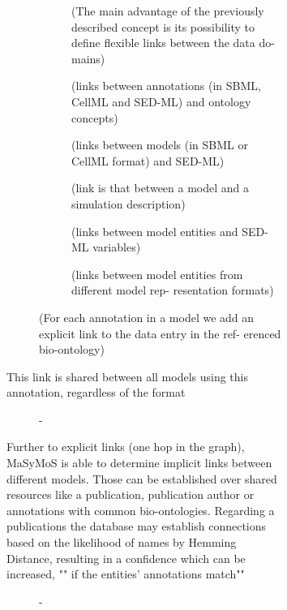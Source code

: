 \begin{description}
\begin{description}
\begin{description}
\begin{description}
\begin{description}
          \begin{description}
            \item[ \cite{Henkel2015} ] (The main advantage of the previously described concept is its possibility to define flexible links between the data do- mains)
            \item[ \cite{Henkel2015} ] (links between annotations (in SBML, CellML and SED-ML) and ontology concepts)
            \item[ \cite{Henkel2015} ] (links between models (in SBML or CellML format) and SED-ML)
            \item[ \cite{Henkel2015} ] (link is that between a model and a simulation description)
            \item[ \cite{Henkel2015} ] (links between model entities and SED-ML variables)
            \item[ \cite{Henkel2015} ] (links between model entities from different model rep- resentation formats)
          \end{description} %
          \item[ \cite{Henkel2015} ] (For each annotation in a model we add an explicit link to the data entry in the ref- erenced bio-ontology)
          \item[This link is shared between all models using this annotation, regardless of the format] - 
          \item[Further to explicit links (one hop in the graph), MaSyMoS is able to determine implicit links between different models. Those can be established over shared resources like a publication, publication author or annotations with common bio-ontologies. Regarding a publications the database may establish connections based on the likelihood of names by Hemming Distance, resulting in a confidence which can be increased, "" if the entities' annotations match""] - 

\end{description}
\end{description}
\end{description}
\end{description}
\end{description}
